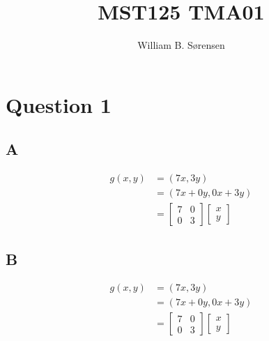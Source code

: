 \documentclass{article}
\author{William B. Sørensen}
\title{MST125 TMA01}
\begin{document}
\maketitle

\tableofcontents
\section{Question 1}

\subsection{A}

\begin{align}
    g(x, y) &= (7x, 3y) \\
            &= (7x + 0y, 0x + 3y) \\
            &= \begin{bmatrix}
                7 & 0 \\
                0 & 3
            \end{bmatrix}
            \begin{bmatrix}
                x \\ y
            \end{bmatrix}
\end{align}

\subsection{B}

\begin{align}
    g(x, y) &= (7x, 3y) \\
            &= (7x + 0y, 0x + 3y) \\
            &= \begin{bmatrix}
                7 & 0 \\
                0 & 3
            \end{bmatrix}
            \begin{bmatrix}
                x \\ y
            \end{bmatrix}
\end{align}
\end{document}
